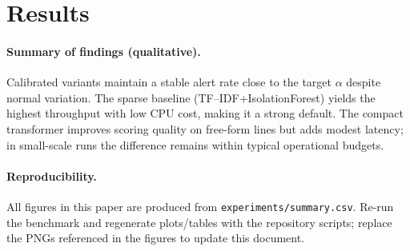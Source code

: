 \documentclass[10pt,twocolumn]{article}
\begin{document}
\section{Results}

\paragraph{Summary of findings (qualitative).} Calibrated variants maintain a stable alert rate close to the target $\alpha$ despite normal variation. The sparse baseline (TF--IDF{+}IsolationForest) yields the highest throughput with low CPU cost, making it a strong default. The compact transformer improves scoring quality on free-form lines but adds modest latency; in small-scale runs the difference remains within typical operational budgets.

\paragraph{Reproducibility.} All figures in this paper are produced from \texttt{experiments/summary.csv}. Re-run the benchmark and regenerate plots/tables with the repository scripts; replace the PNGs referenced in the figures to update this document.




\begin{table}[t]
\centering\small
\caption{Calibrated-only snapshot (target FPR $=1\%$).}
\vspace{0.25em}
\end{table}
\end{document}
